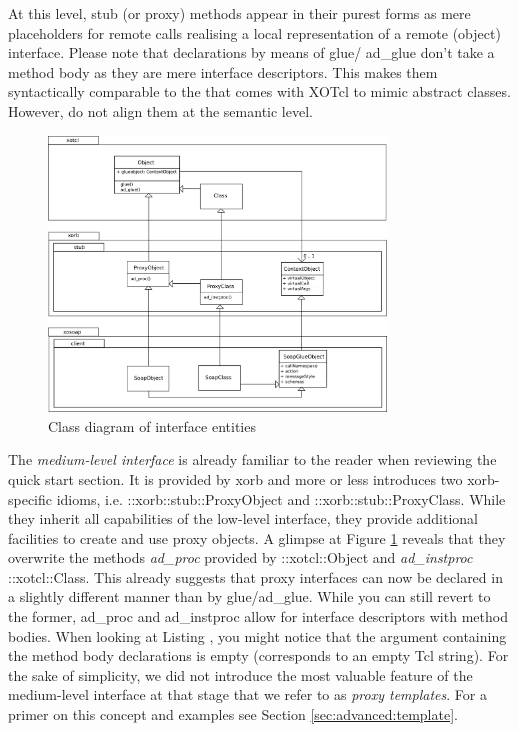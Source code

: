 At this level, stub (or proxy) methods appear in their purest forms as mere placeholders for remote calls realising a local representation of a remote (object) interface. Please note that declarations by means of glue/ ad\_glue don't take a method body as they are mere interface descriptors. This makes them syntactically comparable to the  that comes with XOTcl to mimic abstract classes. However, do not align them at the semantic level.
  \begin{figure}[htbp]
\begin{center}
\includegraphics[width=0.8\textwidth]{img/xorb-xosoap-consumer-interface.png}
\caption{Class diagram of interface entities}
\label{fig:advanced:interface:1}
\end{center}
\end{figure}

The \emph{medium-level interface} is already familiar to the reader when reviewing the quick start section. It is provided by xorb and more or less introduces two xorb-specific idioms, i.e. ::xorb::stub::ProxyObject and ::xorb::stub::ProxyClass. While they inherit all capabilities of the low-level interface, they provide additional facilities to create and use proxy objects. A glimpse at Figure \ref{fig:advanced:interface:1} reveals that they overwrite the methods \emph{ad\_proc} provided by ::xotcl::Object and \emph{ad\_instproc} ::xotcl::Class. This already suggests that proxy interfaces can now be declared in a slightly different manner than by glue/ad\_glue. While you can still revert to the former, ad\_proc and ad\_instproc allow for interface descriptors with method bodies. When looking at Listing , you might notice that the argument containing the method body declarations is empty (corresponds to an empty Tcl string). For the sake of simplicity, we did not introduce the most valuable feature of the medium-level interface at that stage that we refer to as \emph{proxy templates}. For a primer on this concept and examples see Section \ref{sec:advanced:template}. 

